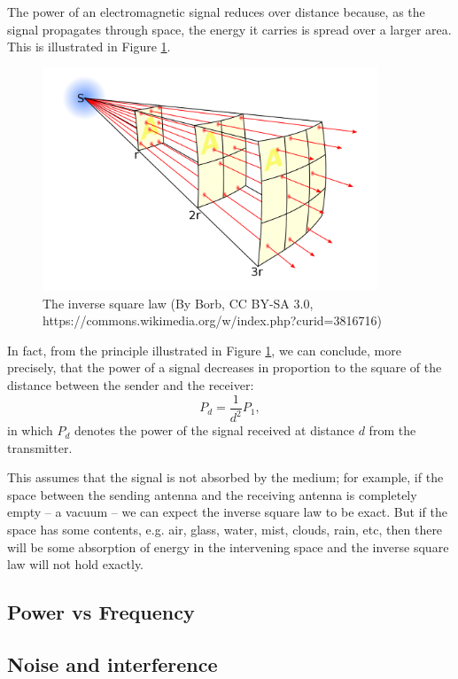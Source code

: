 The power of an electromagnetic signal reduces over distance because,
as the signal propagates through space, the energy it carries is spread
over a larger area. This is illustrated in Figure \ref{inversesquarelaw}.
\begin{figure}
	\centering
	\includegraphics[width=10cm]{Inverse_square_law_svg}
	\caption{The inverse square law (By Borb, CC BY-SA 3.0, https://commons.wikimedia.org/w/index.php?curid=3816716)}
	\label{inversesquarelaw}
\end{figure}

In fact, from the principle illustrated in Figure \ref{inversesquarelaw}, we can conclude,
more precisely, that the power of a signal decreases in proportion to the square of the distance
between the sender and the receiver:
\begin{equation}
	P_d = \frac{1}{d^2} P_1,
\end{equation}
in which $P_d$ denotes the power of the signal received at distance $d$ from the transmitter.

This assumes that the signal is not absorbed by the medium; for example, if the space between
the sending antenna and the receiving antenna is completely empty -- a vacuum -- we can expect
the inverse square law to be exact. But if the space has some contents, e.g. air, glass, water, 
mist, clouds, rain, etc, then there will be some absorption of energy in the intervening space
and the inverse square law will not hold exactly.

\subsection{Power vs Frequency }

\subsection{Noise and interference}

